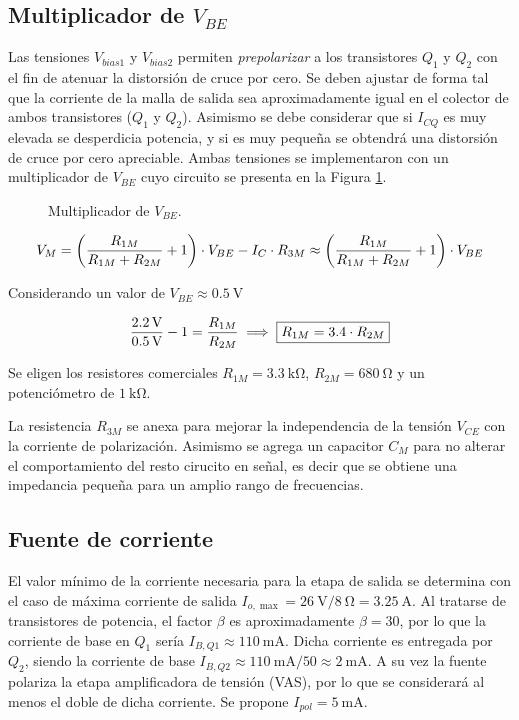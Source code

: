 \subsection{Multiplicador de $V_{BE}$}

	Las tensiones $V_{bias1}$ y $V_{bias2}$ permiten \textit{prepolarizar} a los transistores $Q_1$ y $Q_2$ con el fin de atenuar la distorsión de cruce por cero. Se deben ajustar de forma tal que la corriente de la malla de salida sea aproximadamente igual en el colector de ambos transistores ($Q_1$ y $Q_2$). Asimismo se debe considerar que si $I_{CQ}$ es muy elevada se desperdicia potencia, y si es muy pequeña se obtendrá una distorsión de cruce por cero apreciable. Ambas tensiones se implementaron con un multiplicador de $V_{BE}$ cuyo circuito se presenta en la Figura \ref{fig.multiplicador}.

	\begin{figure}[H]
		\centering
		\scalebox{0.5}{}
		\caption{Multiplicador de $V_{BE}$.}
		\label{fig.multiplicador}
	\end{figure}


	\begin{equation}
		\centering
		V_M = \left( \frac{R_{1M}}{R_{1M} + R_{2M}} +1 \right) \cdot V_{BE} - I_C \cdot R_{3M} \approx  \left( \frac{R_{1M}}{R_{1M} + R_{2M}} +1 \right) \cdot V_{BE}
	\end{equation}

	 Considerando un valor de $V_{BE} \approx \SI{0.5}{\volt}$

	 \begin{equation}
	 	\centering
		\frac{\SI{2.2}{\volt}}{\SI{0.5}{\volt}} -1 = \frac{R_{1M}}{R_{2M}} \implies \boxed{R_{1M} = \num{3,4} \cdot R_{2M}}
	\end{equation}

	Se eligen los resistores comerciales $R_{1M} = \SI{3.3}{\kilo\ohm}$, $R_{2M} = \SI{680}{\ohm}$ y un potenciómetro de $\SI{1}{\kilo\ohm}$. 

	La resistencia $R_{3M}$ se anexa para mejorar la independencia de la tensión $V_{CE}$ con la corriente de polarización. Asimismo se agrega un capacitor $C_M$ para no alterar el comportamiento del resto cirucito en señal, es decir que se obtiene una impedancia pequeña para un amplio rango de frecuencias. 


\subsection{Fuente de corriente}
	El valor mínimo de la corriente necesaria para la etapa de salida se determina con el caso de máxima corriente de salida $I_{o,\max} = \SI{26}{\volt}/ \SI{8}{\ohm} = \SI{3.25}{\ampere}$. Al tratarse de transistores de potencia, el factor $\beta$ es aproximadamente $\beta = 30$, por lo que la corriente de base en $Q_1$ sería $I_{B,Q1} \approx \SI{110}{\milli\ampere}$. Dicha corriente es entregada por $Q_2$, siendo la corriente de base $I_{B,Q2} \approx \SI{110}{\milli\ampere}/50 \approx \SI{2}{\milli\ampere}$. A su vez la fuente polariza la etapa amplificadora de tensión (VAS), por lo que se considerará al menos el doble de dicha corriente. Se propone $I_{pol} = \SI{5}{\milli\ampere}$.

